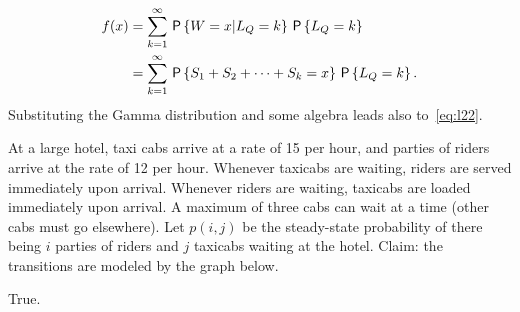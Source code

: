\documentclass[stochastic-or.tex]{subfiles}
\begin{document}
\begin{align*}
f(x)
&= \sum_{k=1}^\infty \P{W = x | L_Q = k}\P{L_Q = k } \\
&= \sum_{k=1}^\infty \P{S_1 + S_2 + \cdots + S_k = x}\P{L_Q = k }.
\end{align*}
Substituting the Gamma distribution and some algebra leads also to~\cref{eq:l22}.

\begin{truefalse}
At a large hotel, taxi cabs arrive at a rate of 15 per
hour, and parties of riders arrive at the rate of 12 per
hour. Whenever taxicabs are waiting, riders are served immediately
upon arrival. Whenever riders are waiting, taxicabs are loaded
immediately upon arrival. A maximum of three cabs can wait at a time (other cabs must go elsewhere). Let $p(i,j)$ be the steady-state probability of there being $i$ parties of riders and $j$ taxicabs waiting at the hotel. Claim: the transitions are modeled by the graph below.

 \begin{center}

 \end{center}
\begin{solution}
True.
\end{solution}
\end{truefalse}
\end{document}
